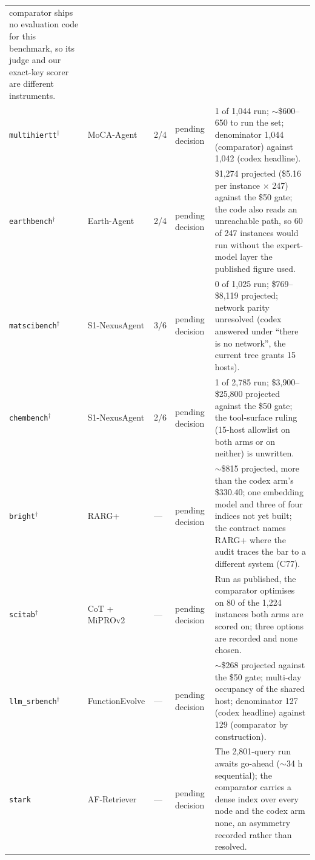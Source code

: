 \begin{longtable}{@{}p{2.8cm}p{2.4cm}p{1.0cm}p{1.5cm}p{\dimexpr\textwidth-7.7cm-24pt\relax}@{}}
comparator ships no evaluation code for this benchmark, so its judge and our exact-key scorer are
different instruments. \\
\texttt{multihiertt}$^{\dagger}$ & MoCA-Agent & 2/4 & pending decision &
1 of 1{,}044 run; $\sim$\$600--650 to run the set; denominator 1{,}044 (comparator) against 1{,}042
(codex headline). \\
\texttt{earthbench}$^{\dagger}$ & Earth-Agent & 2/4 & pending decision &
\$1{,}274 projected (\$5.16 per instance $\times$ 247) against the \$50 gate; the code also reads an
unreachable path, so 60 of 247 instances would run without the expert-model layer the published
figure used. \\
\texttt{matscibench}$^{\dagger}$ & S1-NexusAgent & 3/6 & pending decision &
0 of 1{,}025 run; \$769--\$8{,}119 projected; network parity unresolved (codex answered under ``there
is no network'', the current tree grants 15 hosts). \\
\texttt{chembench}$^{\dagger}$ & S1-NexusAgent & 2/6 & pending decision &
1 of 2{,}785 run; \$3{,}900--\$25{,}800 projected against the \$50 gate; the tool-surface ruling
(15-host allowlist on both arms or on neither) is unwritten. \\
\texttt{bright}$^{\dagger}$ & RARG+ & --- & pending decision &
$\sim$\$815 projected, more than the codex arm's \$330.40; one embedding model and three of four
indices not yet built; the contract names RARG+ where the audit traces the bar to a different
system (C77). \\
\texttt{scitab}$^{\dagger}$ & CoT + MiPROv2 & --- & pending decision &
Run as published, the comparator optimises on 80 of the 1{,}224 instances both arms are scored on;
three options are recorded and none chosen. \\
\texttt{llm\_srbench}$^{\dagger}$ & FunctionEvolve & --- & pending decision &
$\sim$\$268 projected against the \$50 gate; multi-day occupancy of the shared host; denominator
127 (codex headline) against 129 (comparator by construction). \\
\texttt{stark} & AF-Retriever & --- & pending decision &
The 2{,}801-query run awaits go-ahead ($\sim$34 h sequential); the comparator carries a dense index
over every node and the codex arm none, an asymmetry recorded rather than resolved. \\
\end{longtable}
\endgroup
